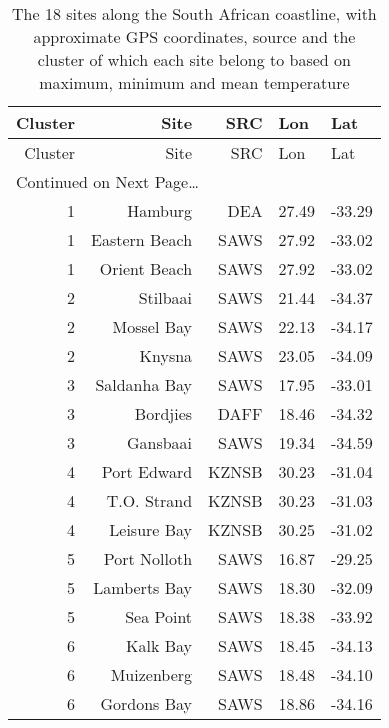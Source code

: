 \documentclass[10pt,a4,]{article}
\begin{document}
\begin{tiny}
\begin{center}
\setlength\tabcolsep{3pt}
\begin{longtable}{|r|r|r|l|p{6cm}|}
\caption{The 18 sites along the South African coastline, with approximate GPS coordinates, source and the cluster of which each site belong to based on maximum, minimum and mean temperature} \\

\toprule
Cluster & Site & SRC & Lon & Lat  \\
\midrule
\endfirsthead

\toprule
Cluster & Site & SRC & Lon & Lat  \\
\midrule
\endhead

\midrule
\multicolumn{5}{l}{{Continued on Next Page\ldots}} \\
\endfoot

\bottomrule
\endlastfoot


1 & Hamburg & DEA & 27.49 & -33.29 \\
1 & Eastern Beach & SAWS & 27.92 & -33.02 \\
1 & Orient Beach & SAWS & 27.92 & -33.02 \\
2 & Stilbaai & SAWS & 21.44 & -34.37 \\
2 & Mossel Bay & SAWS & 22.13 & -34.17 \\
2 & Knysna & SAWS & 23.05 & -34.09 \\
3 & Saldanha Bay & SAWS & 17.95 & -33.01 \\
3 & Bordjies & DAFF & 18.46 & -34.32 \\
3 & Gansbaai & SAWS & 19.34 & -34.59 \\
4 & Port Edward & KZNSB & 30.23 & -31.04 \\
4 & T.O. Strand & KZNSB & 30.23 & -31.03 \\
4 & Leisure Bay & KZNSB & 30.25 & -31.02 \\
5 & Port Nolloth & SAWS & 16.87 & -29.25 \\
5 & Lamberts Bay & SAWS & 18.30 & -32.09 \\
5 & Sea Point & SAWS & 18.38 & -33.92 \\
6 & Kalk Bay & SAWS & 18.45 & -34.13 \\
6 & Muizenberg & SAWS & 18.48 & -34.10 \\
6 & Gordons Bay & SAWS & 18.86 & -34.16 \\

\end{longtable}
\end{center}
\end{tiny}
\end{document}
